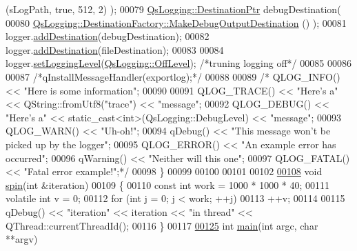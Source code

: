 \begin{DoxyCode}
{      (sLogPath, \textcolor{keyword}{true}, 512, 2) );
00079     \hyperlink{namespaceQsLogging_a8fe41cf859d617f1c23515f804d1e8ec}{QsLogging::DestinationPtr} debugDestination(
00080                 \hyperlink{classQsLogging_1_1DestinationFactory_a69eecb9933440870bb809c4e32ac1987}{QsLogging::DestinationFactory::MakeDebugOutputDestination}
      () );
00081     logger.\hyperlink{classQsLogging_1_1Logger_a76a32c839e837547b14bc5e523b4aa45}{addDestination}(debugDestination);
00082     logger.\hyperlink{classQsLogging_1_1Logger_a76a32c839e837547b14bc5e523b4aa45}{addDestination}(fileDestination);
00083 
00084     logger.\hyperlink{classQsLogging_1_1Logger_aa34d1a0d83e180f15e23a03f9de872c6}{setLoggingLevel}(\hyperlink{namespaceQsLogging_a38c7dd87e4de6f8eb460763ad0baa033a64b8289ed8a99f811404140cbcb2549c}{QsLogging::OffLevel}); \textcolor{comment}{/*truning logging off*/}
00085 
00086 
00087     \textcolor{comment}{/*qInstallMessageHandler(exportlog);*/}
00088 
00089     \textcolor{comment}{/* QLOG\_INFO() << "Here is some information";}
00090 \textcolor{comment}{}
00091 \textcolor{comment}{        QLOG\_TRACE() << "Here's a" << QString::fromUtf8("trace") << "message";}
00092 \textcolor{comment}{        QLOG\_DEBUG() << "Here's a" << static\_cast<int>(QsLogging::DebugLevel) << "message";}
00093 \textcolor{comment}{        QLOG\_WARN()  << "Uh-oh!";}
00094 \textcolor{comment}{        qDebug() << "This message won't be picked up by the logger";}
00095 \textcolor{comment}{        QLOG\_ERROR() << "An example error has occurred";}
00096 \textcolor{comment}{        qWarning() << "Neither will this one";}
00097 \textcolor{comment}{        QLOG\_FATAL() << "Fatal error example!";*/}
00098 \}
00099 
00100 
00101 
00102 
\hypertarget{main_8cpp_source_l00108}{}\hyperlink{main_8cpp_ae410a0b90b40ede93034f3ec13d27b8e}{00108} \textcolor{keywordtype}{void} \hyperlink{main_8cpp_ae410a0b90b40ede93034f3ec13d27b8e}{spin}(\textcolor{keywordtype}{int} &iteration)
00109 \{
00110     \textcolor{keyword}{const} \textcolor{keywordtype}{int} work = 1000 * 1000 * 40;
00111     \textcolor{keyword}{volatile} \textcolor{keywordtype}{int} v = 0;
00112     \textcolor{keywordflow}{for} (\textcolor{keywordtype}{int} j = 0; j < work; ++j)
00113         ++v;
00114 
00115     qDebug() << \textcolor{stringliteral}{"iteration"} << iteration << \textcolor{stringliteral}{"in thread"} << QThread::currentThreadId();
00116 \}
00117 
\hypertarget{main_8cpp_source_l00125}{}\hyperlink{main_8cpp_a3c04138a5bfe5d72780bb7e82a18e627}{00125} \textcolor{keywordtype}{int} \hyperlink{main_8cpp_a3c04138a5bfe5d72780bb7e82a18e627}{main}(\textcolor{keywordtype}{int} argc, \textcolor{keywordtype}{char} **argv)
}
\end{DoxyCode}
